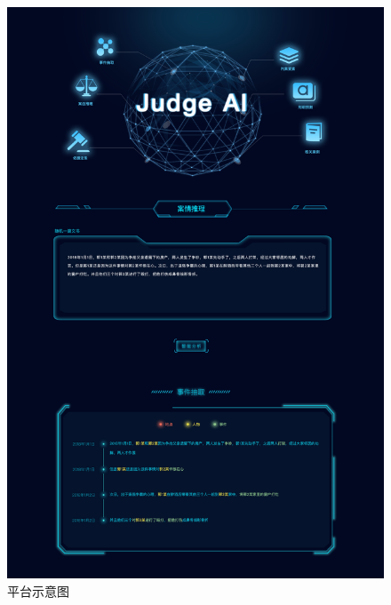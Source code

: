 \begin{figure}[ht]
	\centering
    \includegraphics[width=\linewidth]{figures/demo_use/page_1}
    \caption{平台示意图}
    \label{fig:demo_page1}
\end{figure}

